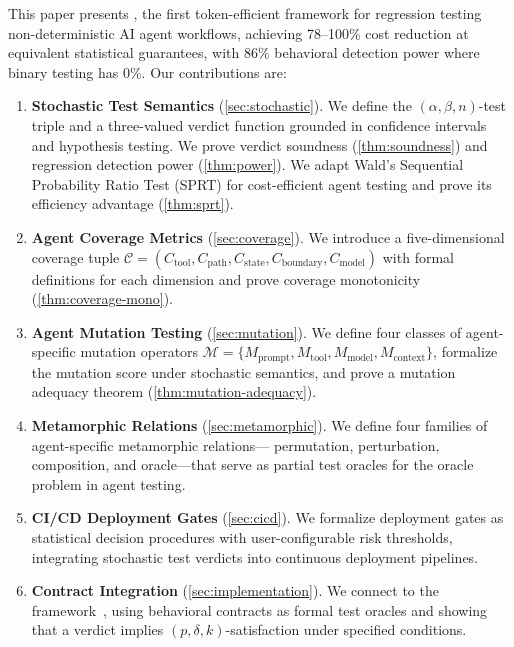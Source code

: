 This paper presents \agentassay{}, the first token-efficient framework
for regression testing non-deterministic AI agent workflows, achieving
78--100\% cost reduction at equivalent statistical guarantees, with
86\% behavioral detection power where binary testing has 0\%.
Our contributions are:

\begin{enumerate}[leftmargin=*,label=\textbf{C\arabic*.}]
  \item \textbf{Stochastic Test Semantics} (\cref{sec:stochastic}). We
    define the $(\alpha, \beta, n)$-test triple and a three-valued
    verdict function grounded in confidence intervals and hypothesis
    testing. We prove verdict soundness (\cref{thm:soundness}) and
    regression detection power (\cref{thm:power}). We adapt Wald's
    Sequential Probability Ratio Test (SPRT) for cost-efficient agent
    testing and prove its efficiency advantage (\cref{thm:sprt}).

  \item \textbf{Agent Coverage Metrics} (\cref{sec:coverage}). We
    introduce a five-dimensional coverage tuple
    $\mathcal{C} = (C_{\text{tool}}, C_{\text{path}}, C_{\text{state}},
    C_{\text{boundary}}, C_{\text{model}})$ with formal definitions for
    each dimension and prove coverage monotonicity (\cref{thm:coverage-mono}).

  \item \textbf{Agent Mutation Testing} (\cref{sec:mutation}). We define
    four classes of agent-specific mutation operators
    $\mathcal{M} = \{M_{\text{prompt}}, M_{\text{tool}},
    M_{\text{model}}, M_{\text{context}}\}$, formalize the mutation
    score under stochastic semantics, and prove a mutation adequacy
    theorem (\cref{thm:mutation-adequacy}).

  \item \textbf{Metamorphic Relations} (\cref{sec:metamorphic}). We
    define four families of agent-specific metamorphic relations---
    permutation, perturbation, composition, and oracle---that serve as
    partial test oracles for the oracle problem in agent testing.

  \item \textbf{CI/CD Deployment Gates} (\cref{sec:cicd}). We formalize
    deployment gates as statistical decision procedures with
    user-configurable risk thresholds, integrating stochastic test
    verdicts into continuous deployment pipelines.

  \item \textbf{Contract Integration} (\cref{sec:implementation}). We
    connect \agentassay{} to the \agentassert{}
    framework~\citep{bhardwaj2026abc}, using behavioral contracts as
    formal test oracles and showing that a \PASS{} verdict implies
    $(p, \delta, k)$-satisfaction under specified conditions.


\end{enumerate}
